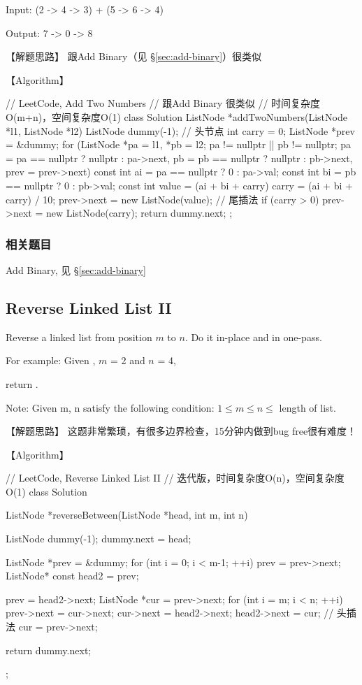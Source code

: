 Input: {\small {} (2 -> 4 -> 3) + (5 -> 6 -> 4)}

Output: {\small {} 7 -> 0 -> 8}


【解题思路】
跟Add Binary（见 \S \ref{sec:add-binary}）很类似


【Algorithm】
\begin{Code}
	// LeetCode, Add Two Numbers
	// 跟Add Binary 很类似
	// 时间复杂度O(m+n)，空间复杂度O(1)
	class Solution {
		ListNode *addTwoNumbers(ListNode *l1, ListNode *l2) {
			ListNode dummy(-1); // 头节点
			int carry = 0;
			ListNode *prev = &dummy;
			for (ListNode *pa = l1, *pb = l2;
				pa != nullptr || pb != nullptr;
				pa = pa == nullptr ? nullptr : pa->next,
				pb = pb == nullptr ? nullptr : pb->next,
				prev = prev->next) {
					const int ai = pa == nullptr ? 0 : pa->val;
					const int bi = pb == nullptr ? 0 : pb->val;
					const int value = (ai + bi + carry) %
					carry = (ai + bi + carry) / 10;
					prev->next = new ListNode(value); // 尾插法
			}
			if (carry > 0)
				prev->next = new ListNode(carry);
			return dummy.next;
		}
	};
\end{Code}


\subsubsection{相关题目}

\begindot
\item Add Binary, 见 \S \ref{sec:add-binary}
\myenddot


\subsection{Reverse Linked List II}
\label{sec:reverse-linked-list-ii}



Reverse a linked list from position $m$ to $n$. Do it in-place and in one-pass.

For example:
Given , $m$ = 2 and $n$ = 4,

return .

Note:
Given m, n satisfy the following condition:
$1 \leq m \leq  n \leq $ length of list.


【解题思路】
这题非常繁琐，有很多边界检查，15分钟内做到bug free很有难度！


【Algorithm】
\begin{Code}
	// LeetCode, Reverse Linked List II
	// 迭代版，时间复杂度O(n)，空间复杂度O(1)
	class Solution {
		ListNode *reverseBetween(ListNode *head, int m, int n) {
			ListNode dummy(-1);
			dummy.next = head;
			
			ListNode *prev = &dummy;
			for (int i = 0; i < m-1; ++i)
				prev = prev->next;
			ListNode* const head2 = prev;
			
			prev = head2->next;
			ListNode *cur = prev->next;
			for (int i = m; i < n; ++i) {
				prev->next = cur->next;
				cur->next = head2->next;
				head2->next = cur;  // 头插法
				cur = prev->next;
			}
			
			return dummy.next;
		}
	};
\end{Code}


